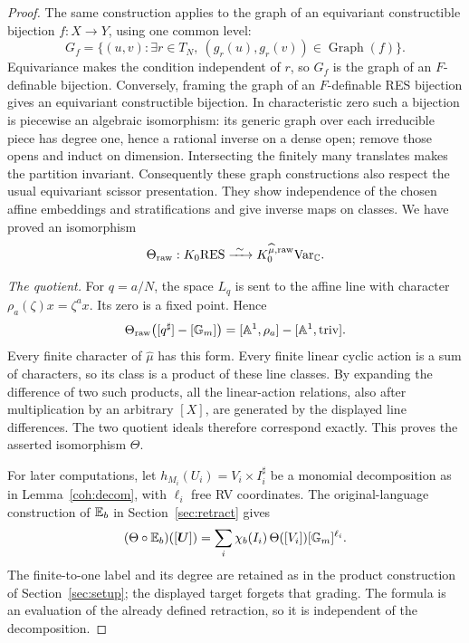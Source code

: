 \begin{proof}
The same construction applies to the graph of an equivariant
constructible bijection $f:X\to Y$, using one common level:
\[
 G_f=\{(u,v):\exists r\in T_N,\
              (g_r(u),g_r(v))\in\operatorname{Graph}(f)\}.
\]
Equivariance makes the condition independent of $r$, so $G_f$
is the graph of an $F$-definable bijection.
Conversely, framing the graph of an $F$-definable RES bijection
gives an equivariant constructible bijection.
In characteristic zero such a bijection is piecewise an
algebraic isomorphism: its generic graph over each irreducible
piece has degree one, hence a rational inverse on a dense open;
remove those opens and induct on dimension. Intersecting the
finitely many translates makes the partition invariant.
Consequently these graph constructions also respect the usual
equivariant scissor presentation. They show independence of the
chosen affine embeddings and stratifications and give inverse
maps on classes. We have proved an isomorphism
\[
 \Theta_{\mathrm{raw}}:\ggk\RES\xrightarrow{\ \sim\ }\ggk^{\widehat\mu,\mathrm{raw}}\var_{\C} .
\]

\emph{The quotient.}
For $q=a/N$, the space $L_q$ is sent to the affine line with
character $\rho_a(\zeta)x=\zeta^a x$. Its zero is a fixed point.
Hence
\[
 \Theta_{\mathrm{raw}}
 \bigl([q^\sharp]-[\mathbb G_m]\bigr)
 =
 [\mathbb A^1,\rho_a]-[\mathbb A^1,\mathrm{triv}].
\]
Every finite character of $\widehat\mu$ has this form.
Every finite linear cyclic action is a sum of characters, so its
class is a product of these line classes. By expanding the
difference of two such products, all the linear-action relations,
also after multiplication by an arbitrary $[X]$, are generated
by the displayed line differences. The two quotient ideals
therefore correspond exactly. This proves the asserted
isomorphism $\Theta$.

For later computations, let
$h_{M_i}(U_i)=V_i\times I_i^\sharp$ be a monomial decomposition
as in Lemma~\ref{coh:decom}, with $\ell_i$ free RV coordinates.
The original-language construction of $\mathbb E_b$ in Section~\ref{sec:retract} gives
\begin{equation}\label{twist:C}
 (\Theta\circ\mathbb E_b)([\bm U])
   =\sum_i\chi_b(I_i)\,\Theta([V_i])[\mathbb G_m]^{\ell_i}.
\end{equation}
The finite-to-one label and its degree are retained as in the
product construction of Section~\ref{sec:setup}; the displayed target forgets
that grading. The formula is an evaluation of the already defined
retraction, so it is independent of the decomposition.
\end{proof}

